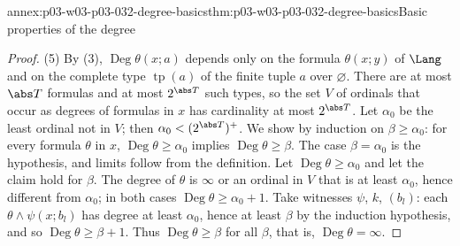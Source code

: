 \begin{annexitem}{annex:p03-w03-p03-032-degree-basics}{thm:p03-w03-p03-032-degree-basics}{Basic properties of the degree}
\begin{proof}
(5) By (3), \(\operatorname{Deg}\theta(x;a)\) depends only on the formula
\(\theta(x;y)\) of \(\Lang\) and on the complete type \(\operatorname{tp}(a)\)
of the finite tuple \(a\) over \(\varnothing\).  There are at most
\(\abs T\) formulas and at most \(2^{\abs T}\) such types, so the set \(V\)
of ordinals that occur as degrees of formulas in \(x\) has cardinality at
most \(2^{\abs T}\).  Let \(\alpha_0\) be the least ordinal not in \(V\);
then \(\alpha_0<(2^{\abs T})^+\).  We show by induction on
\(\beta\geq\alpha_0\): for every formula \(\theta\) in \(x\),
\(\operatorname{Deg}\theta\geq\alpha_0\) implies
\(\operatorname{Deg}\theta\geq\beta\).  The case \(\beta=\alpha_0\) is the
hypothesis, and limits follow from the definition.  Let
\(\operatorname{Deg}\theta\geq\alpha_0\) and let the claim hold for
\(\beta\).  The degree of \(\theta\) is \(\infty\) or an ordinal in \(V\) that
is at least \(\alpha_0\), hence different from \(\alpha_0\); in both cases
\(\operatorname{Deg}\theta\geq\alpha_0+1\).  Take witnesses \(\psi\), \(k\),
\((b_l)\): each \(\theta\wedge\psi(x;b_l)\) has degree at least
\(\alpha_0\), hence at least \(\beta\) by the induction hypothesis, and so
\(\operatorname{Deg}\theta\geq\beta+1\).  Thus
\(\operatorname{Deg}\theta\geq\beta\) for all \(\beta\), that is,
\(\operatorname{Deg}\theta=\infty\).
\end{proof}
\end{annexitem}

